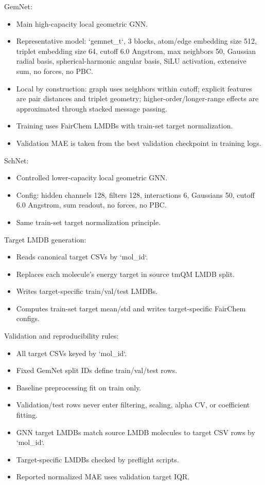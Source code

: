 GemNet:
\begin{itemize}
  \item Main high-capacity local geometric GNN.
  \item Representative model: `gemnet_t`, 3 blocks, atom/edge embedding size 512, triplet embedding size 64, cutoff 6.0 Angstrom, max neighbors 50, Gaussian radial basis, spherical-harmonic angular basis, SiLU activation, extensive sum, no forces, no PBC.
  \item Local by construction: graph uses neighbors within cutoff; explicit features are pair distances and triplet geometry; higher-order/longer-range effects are approximated through stacked message passing.
  \item Training uses FairChem LMDBs with train-set target normalization.
  \item Validation MAE is taken from the best validation checkpoint in training logs.
\end{itemize}

SchNet:
\begin{itemize}
  \item Controlled lower-capacity local geometric GNN.
  \item Config: hidden channels 128, filters 128, interactions 6, Gaussians 50, cutoff 6.0 Angstrom, sum readout, no forces, no PBC.
  \item Same train-set target normalization principle.
\end{itemize}

Target LMDB generation:
\begin{itemize}
  \item Reads canonical target CSVs by `mol_id`.
  \item Replaces each molecule's energy target in source tmQM LMDB split.
  \item Writes target-specific train/val/test LMDBs.
  \item Computes train-set target mean/std and writes target-specific FairChem configs.
\end{itemize}

Validation and reproducibility rules:
\begin{itemize}
  \item All target CSVs keyed by `mol_id`.
  \item Fixed GemNet split IDs define train/val/test rows.
  \item Baseline preprocessing fit on train only.
  \item Validation/test rows never enter filtering, scaling, alpha CV, or coefficient fitting.
  \item GNN target LMDBs match source LMDB molecules to target CSV rows by `mol_id`.
  \item Target-specific LMDBs checked by preflight scripts.
  \item Reported normalized MAE uses validation target IQR.
\end{itemize}

